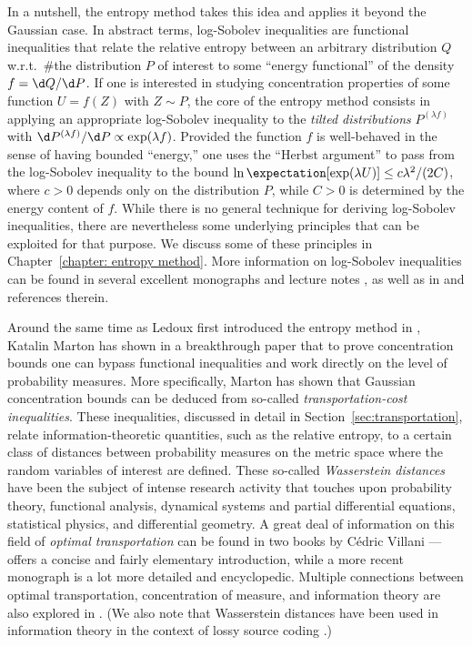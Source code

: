 \documentclass{article}
\theoremstyle{plain}
\begin{document}
In a nutshell, the entropy method takes this idea and applies it beyond the Gaussian case. In abstract terms, log-Sobolev inequalities are functional inequalities that relate the relative entropy between an arbitrary distribution $Q$ w.r.t.\ #the distribution $P$ of interest to some ``energy functional'' 
of the density $f = \d Q / \d P$. If one is interested in studying concentration properties of some function $U = f(Z)$ with $Z \sim P$, the core of the entropy method consists in applying an appropriate log-Sobolev inequality to the {\em tilted distributions} $P^{(\lambda f)}$ with $\d P^{(\lambda f)}/\d P \propto \exp(\lambda f)$. 
Provided the function $f$ is well-behaved in the sense of having bounded ``energy,'' one uses the ``Herbst argument'' to pass from the log-Sobolev 
inequality to the bound $\ln \expectation[\exp(\lambda U)] \le c\lambda^2/(2C)$, where $c > 0$ depends only on the distribution $P$, while $C > 0$ is 
determined by the energy content of $f$. While there is no general technique for deriving log-Sobolev inequalities, there are nevertheless some 
underlying principles that can be exploited for that purpose. We discuss some of these principles in Chapter~\ref{chapter: entropy method}. More 
information on log-Sobolev inequalities can be found in several excellent monographs and lecture notes \cite{Ledoux,Massart_book,Guionnet_Zegarlinski,
Ledoux_lecture_notes,Royer}, as well as in \cite{Bobkov_Gotze_expint,Bobkov_Ledoux,Bobkov_Tetali,Chafai,KitsosT_IT09} and references therein.



Around the same time as Ledoux first introduced the entropy method in \cite{Ledoux_paper}, Katalin Marton has shown in a breakthrough paper \cite{
Marton_dbar}  that to prove concentration bounds one can bypass functional inequalities and work directly on the level of probability measures. More 
specifically, Marton has shown that Gaussian concentration bounds can be deduced from so-called {\em transportation-cost inequalities}. These 
inequalities, discussed in detail in Section~\ref{sec:transportation}, relate information-theoretic quantities, 
such as the relative entropy, to a certain class of distances between probability measures on the metric space where the random variables of interest 
are defined. These so-called {\em Wasserstein distances} have been the subject of intense research activity that touches upon probability theory, 
functional analysis, dynamical systems and partial differential equations, statistical physics, and differential geometry. A great deal of information 
on this field of {\em optimal transportation} can be found in two books by C\'edric Villani --- \cite{Villani_TOT} offers a concise and fairly 
elementary introduction, while a more recent monograph \cite{Villani_newbook} is a lot more detailed and encyclopedic. Multiple connections between 
optimal transportation, concentration of measure, and information theory are also explored in \cite{Gozlan_Leonard,Dembo,Cattiaux_Guillin,
Dembo_Zeitouni_TC,Djellout_Guillin_Wu,Gozlan,E_Milman}. (We also note that Wasserstein distances have been used in information theory in the context of 
lossy source coding \cite{Gray_Neuhoff_Shields_dbar,Gray_Neuhoff_Omura}.)
\end{document}
